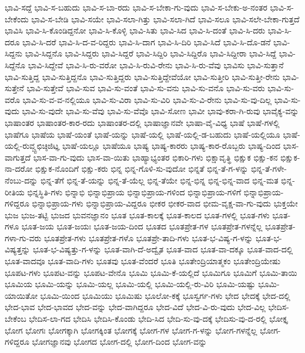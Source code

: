 {ಭಾವಿ-ಸದ್ದೆ
ಭಾವಿ-ಸ-ಬಹುದು
ಭಾವಿ-ಸ-ಬಾ-ರದು
ಭಾವಿ-ಸ-ಬೇಕಾ-ಗು-ವುದು
ಭಾವಿ-ಸ-ಬೇಕು-ಅ-ನಂತರ
ಭಾವಿ-ಸ-ಬೇಕೆಂದು
ಭಾವಿ-ಸ-ಬೇಡಿ
ಭಾವಿ-ಸಯೇ
ಭಾವಿ-ಸಲಾ-ಗಿತ್ತು
ಭಾವಿ-ಸಲಾ-ಗಿದೆ
ಭಾವಿ-ಸಲೂ
ಭಾವಿ-ಸಲೇ-ಬೇಕಾ-ಗುತ್ತದೆ
ಭಾವಿಸಿ
ಭಾವಿ-ಸಿ-ಕೊಂಡಿದ್ದನೋ
ಭಾವಿ-ಸಿ-ಕೊಳ್ಳಿ
ಭಾವಿ-ಸಿತು
ಭಾವಿ-ಸಿದ
ಭಾವಿ-ಸಿ-ದಂತೆ
ಭಾವಿ-ಸಿ-ದರು
ಭಾವಿ-ಸಿ-ದರೂ
ಭಾವಿ-ಸಿ-ದರೆ
ಭಾವಿ-ಸಿ-ದ-ವ-ರಿದ್ದರು
ಭಾವಿ-ಸಿ-ದಾಗ
ಭಾವಿ-ಸಿ-ದಿರಿ
ಭಾವಿ-ಸಿದೆ
ಭಾವಿ-ಸಿ-ದೊ-ಡನೆ
ಭಾವಿ-ಸಿದ್ದನು
ಭಾವಿ-ಸಿದ್ದನೊ
ಭಾವಿ-ಸಿದ್ದರು
ಭಾವಿ-ಸಿದ್ದರೆ
ಭಾವಿ-ಸಿದ್ದಿರಿ
ಭಾವಿ-ಸಿದ್ದಿರೊ
ಭಾವಿ-ಸಿದ್ದೀರಾ
ಭಾವಿ-ಸಿದ್ದೆ
ಭಾವಿ-ಸಿದ್ದೆನೊ
ಭಾವಿ-ಸಿದ್ದೇವೆ
ಭಾವಿ-ಸಿ-ರು-ವರೋ
ಭಾವಿ-ಸಿ-ರುವಿ-ರೇನು
ಭಾವಿ-ಸಿ-ರು-ವೆವು
ಭಾವಿಸು
ಭಾವಿ-ಸುತ್ತಾನೆ
ಭಾವಿ-ಸುತ್ತಿದ್ದ
ಭಾವಿ-ಸುತ್ತಿದ್ದನೊ
ಭಾವಿ-ಸುತ್ತಿದ್ದರು
ಭಾವಿ-ಸುತ್ತಿದ್ದೇವೆಯೋ
ಭಾವಿ-ಸುತ್ತೀರಿ
ಭಾವಿ-ಸುತ್ತೀ-ರೇನು
ಭಾವಿ-ಸುತ್ತೇನೆ
ಭಾವಿ-ಸುತ್ತೇವೆ
ಭಾವಿ-ಸುವ
ಭಾವಿ-ಸು-ವಂತೆ
ಭಾವಿ-ಸು-ವನು
ಭಾವಿ-ಸು-ವನೊ
ಭಾವಿ-ಸು-ವರು
ಭಾವಿ-ಸು-ವರೊ
ಭಾವಿ-ಸು-ವ-ವ-ನಲ್ಲಿಯೂ
ಭಾವಿ-ಸು-ವಿರಾ
ಭಾವಿ-ಸು-ವಿರಿ
ಭಾವಿ-ಸು-ವಿ-ರೇನು
ಭಾವಿ-ಸು-ವು-ದಿಲ್ಲ
ಭಾವಿ-ಸು-ವುದು
ಭಾವಿ-ಸು-ವುದೇ
ಭಾವಿ-ಸು-ವೆವು
ಭಾವಿ-ಸು-ವೆವೊ
ಭಾವಿ-ಸೋಣ
ಭಾವೀ
ಭಾವು-ಕರಾ-ಗಿ-ರುವು
ಭಾವೈಕ್ಯ-ವನ್ನು
ಭಾಷಾಂತರ
ಭಾಷಾಂತರ-ಕಾರ-ರದು
ಭಾಷಾಂತರ-ದಲ್ಲಿ
ಭಾಷಾಜ್ಞಾನವೇ
ಭಾಷಾ-ವೈ-ವಿಧ್ಯ
ಭಾಷೆ
ಭಾಷೆ-ಗಳಲ್ಲಿ
ಭಾಷೆಗೂ
ಭಾಷೆಯ
ಭಾಷೆ-ಯಂತೆ
ಭಾಷೆ-ಯನ್ನು
ಭಾಷೆ-ಯಲ್ಲಿ
ಭಾಷೆ-ಯಲ್ಲಿ-ಡ-ಬಹುದು
ಭಾಷೆ-ಯಲ್ಲಿಯೂ
ಭಾಷೆ-ಯಲ್ಲಿ-ರುವ್ಚ್ಟಛಿಚ್ಠಿಜಿಟ್ಞ
ಭಾಷೆ-ಯಲ್ಲೂ
ಭಾಷೆಯೂ
ಭಾಷ್ಯ
ಭಾಷ್ಯ-ಕಾರರು
ಭಾಷ್ಯ-ಕಾರ-ರೊಬ್ಬರು
ಭಾಷ್ಯ-ದಿಂದ
ಭಾಸ-ವಾಗುತ್ತದೆ
ಭಾಸ-ವಾ-ಗು-ವುದು
ಭಾಸ-ವಾ-ಯಿತು
ಭಾಹ್ಯಾಭ್ಯಂತರ
ಭಿಕಾರಿ-ಗಳು
ಭಿಕ್ಷಾವೃತ್ಥಿ
ಭಿಕ್ಷುಕ
ಭಿಕ್ಷು-ಕನ
ಭಿಕ್ಷುಕ-ನಾ-ದರೋ
ಭಿಕ್ಷುಕ-ನೊಂದಿಗೆ
ಭಿಕ್ಷು-ಕರು
ಭಿನ್ನ
ಭಿನ್ನ-ಗೊಳಿ-ಸು-ವುದೋ
ಭಿನ್ನತೆ
ಭಿನ್ನ-ತೆ-ಗ-ಳನ್ನು
ಭಿನ್ನ-ತೆ-ಗಳೇ-ನೆಂಬು-ದನ್ನು
ಭಿನ್ನ-ತೆಗೆ
ಭಿನ್ನ-ತೆ-ಯನ್ನು
ಭಿನ್ನ-ತೆ-ಯೆಲ್ಲ
ಭಿನ್ನ-ತೆಯೇ
ಭಿನ್ನ-ಭಿನ್ನ
ಭಿನ್ನ-ಭಿನ್ನ-ವಾದ
ಭಿನ್ನ-ಮತ
ಭಿನ್ನ-ರೀತಿಯ
ಭಿನ್ನಸ್ಥಿತಿ-ಗಳು
ಭಿನ್ನಾಭಿ
ಭಿನ್ನಾಭಿಪ್ರಾಯ
ಭಿನ್ನಾಭಿಪ್ರಾಯ-ಗಳಿಂದ
ಭಿನ್ನಾಭಿಪ್ರಾಯ-ಗಳಿಗೆ
ಭಿನ್ನಾಭಿಪ್ರಾಯ-ಗಳಿದ್ದರೂ
ಭಿನ್ನಾಭಿಪ್ರಾಯ-ಗಳು
ಭಿನ್ನಾಭಿಪ್ರಾಯ-ವಿದ್ದರೂ
ಭೀಕರ
ಭೀಕರ-ವಾದ
ಭೀಮ-ವೃಕ್ಷ-ವಾ-ಗು-ವುದು
ಭುಕ್ತಯೇ
ಭುಜ
ಭುಜ-ತಟ್ಟಿ
ಭುಜದ
ಭುವನಜ್ಞಾನಂ
ಭೂತ
ಭೂತ-ಕಾಲಕ್ಕೆ
ಭೂತ-ಕಾಲದ
ಭೂತ-ಗಳಲ್ಲಿ
ಭೂತ-ಗಳು
ಭೂತ-ಗಳೂ
ಭೂತ-ಜಯ
ಭೂತ-ಜಯಃ
ಭೂತ-ಜಯ-ದಿಂದ
ಭೂತದ
ಭೂತಪ್ರೇತ-ಗಳ
ಭೂತಪ್ರೇತ-ಗಳನ್ನೆಲ್ಲ
ಭೂತಪ್ರೇತ-ಗಳಾ-ಗು-ವರು
ಭೂತಪ್ರೇತ-ಗಳು
ಭೂತಪ್ರೇತ-ಗಳೊ
ಭೂತಪ್ರೇ-ತಾದಿ-ಗಳು
ಭೂತ-ಭ-ವಿಷ್ಯ-ಗ-ಳನ್ನು
ಭೂತ-ಭ-ವಿಷ್ಯತ್ತನ್ನು
ಭೂತ-ಭ-ವಿಷ್ಯತ್ತು-ಗ-ಳನ್ನು
ಭೂತ-ವಾಗಿ-ದೆ-ಅದ್ವೈತ
ಭೂತ-ವಾದ
ಭೂತ-ವಾ-ದಕ್ಕೂ
ಭೂತ-ವಾದ-ದಲ್ಲಿ
ಭೂತ-ವಾದವೂ
ಭೂತ-ವಾದಿ-ಗಳು
ಭೂತವು
ಭೂತ-ವೆಂದರೆ
ಭೂತಿ
ಭೂತೇಂದ್ರಿಯಾತ್ಮಕಂ
ಭೂತೇಂದ್ರಿಯೇಷು
ಭೂಪಟ-ಗಳು
ಭೂಪಟ-ವನ್ನು
ಭೂಪಟ-ವೇನೊ
ಭೂಮಿ
ಭೂಮಿ-ಕೆ-ಯಲ್ಲಿದೆ
ಭೂಮಿಗೂ
ಭೂಮಿಗೆ
ಭೂಮಿ-ತಾಯಿ
ಭೂಮಿಯ
ಭೂಮಿ-ಯನ್ನು
ಭೂಮಿ-ಯಲ್ಲ
ಭೂಮಿ-ಯಲ್ಲಿ
ಭೂಮಿ-ಯಲ್ಲಿ-ರು-ವಿರಿ
ಭೂಮಿ-ಯಷ್ಟು
ಭೂಮಿ-ಯಾಯಿತೋ
ಭೂಮಿ-ಯಿಂದ
ಭೂಮಿಯು
ಭೂಮಿಷು
ಭೂಲೋ-ಕಕ್ಕೆ
ಭೂಸ್ವರ್ಗ-ಗಳು
ಭೇದ
ಭೇದಕ್ಕೆ
ಭೇದ-ದಲ್ಲಿ
ಭೇದ-ಭಾವ
ಭೇದ-ಭಾವದ
ಭೇದ-ವನ್ನು
ಭೇದ-ವಾಗಿದ್ದರೂ
ಭೇದ-ವಿದೆ
ಭೇದ-ವಿ-ರು-ವುದು
ಭೇದ-ವಿಲ್ಲ
ಭೇದಿಸ-ಬೇಕೆಂಬ
ಭೇದಿಸ-ಲಾ-ಗದ
ಭೇದಿಸಿ
ಭೇದಿಸಿ-ಕೊಂಡು
ಭೇದಿ-ಸಿದ
ಭೇದಿ-ಸು-ವು-ದಕ್ಕೆ
ಭೇದಿಸು-ವು-ದ-ರಲ್ಲಿ
ಭೋಕ್ತೃ
ಭೋಗ
ಭೋಗಃ
ಭೋಗಕ್ಕಾಗಿ
ಭೋಗಕ್ಕಿಂತ
ಭೋಗಕ್ಕೆ
ಭೋಗ-ಗಳ
ಭೋಗ-ಗ-ಳನ್ನು
ಭೋಗ-ಗಳನ್ನೆಲ್ಲ
ಭೋಗ-ಗಳಿದ್ದರೂ
ಭೋಗಜ್ಞಾನವು
ಭೋಗದ
ಭೋಗ-ದಲ್ಲಿ
ಭೋಗ-ದಿಂದ
ಭೋಗ-ವನ್ನು
}
